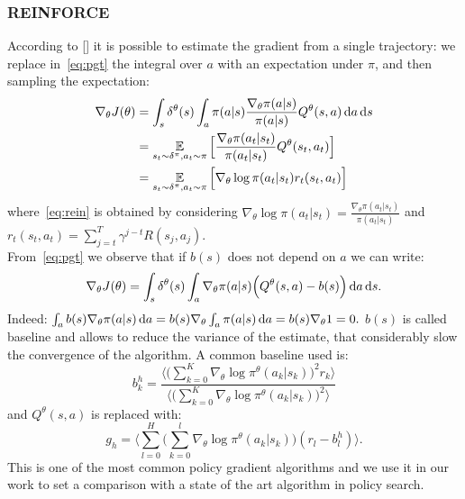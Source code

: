 \subsubsection{REINFORCE}
According to [\citet{Williams1992SimpleSG}] it is possible to estimate the gradient from a single trajectory: we replace in~\eqref{eq:pgt} the integral over $a$ with an expectation under $\pi$, and then sampling the expectation:
\begin{align}
	\nabla_{\theta}J(\theta) &= \int_s \delta^{\theta}(s) \int_a \pi(a|s) \frac{\nabla_{\theta} \pi(a|s)}{\pi(a|s)} Q^{\theta}(s,a) \,\mathrm{d} a \,\mathrm{d} s \nonumber\\
	&= \operatorname*{\mathbb{E}}_{s_t \sim \delta^{\pi}, a_t \sim \pi} \Big[ \frac{\nabla_{\theta} \pi(a_t|s_t)}{\pi(a_t|s_t)} Q^{\theta}(s_t,a_t) \Big] \nonumber\\
	&= \operatorname*{\mathbb{E}}_{s_t \sim \delta^{\pi}, a_t \sim \pi} \Big[ \nabla_{\theta} \log\pi(a_t|s_t) r_t(s_t, a_t) \Big] \label{eq:rein}
\end{align}
where~\eqref{eq:rein} is obtained by considering $\nabla_{\theta} \log\pi(a_t|s_t) = \frac{\nabla_{\theta} \pi(a_t|s_t)}{\pi(a_t|s_t)}$ and $r_t(s_t, a_t) = \sum_{j = t}^T \gamma^{j-t} R(s_j, a_j)$.\\
\newline
From~\eqref{eq:pgt} we observe that if $b(s)$ does not depend on $a$ we can write:
$$ \nabla_{\theta}J(\theta) = \int_s \delta^{\theta}(s) \int_a \nabla_{\theta} \pi(a|s) \Big( Q^{\theta}(s,a) -b(s) \Big) \,\mathrm{d} a \,\mathrm{d} s. $$
Indeed: $\int_a b(s) \nabla_{\theta} \pi(a|s) \,\mathrm{d} a = b(s) \nabla_{\theta} \int_a \pi(a|s) \,\mathrm{d} a = b(s) \nabla_{\theta} 1 = 0.$
$b(s)$ is called baseline and allows to reduce the variance of the estimate, that considerably slow the convergence of the algorithm.
A common baseline used is:
$$ b_k^h = \frac{\Big\langle\Big( \sum_{k=0}^{K}\nabla_{\theta} \log\pi^{\theta}(a_k|s_k)\Big)^2r_k \Big\rangle}{\Big\langle\Big( \sum_{k=0}^{K}\nabla_{\theta} \log\pi^{\theta}(a_k|s_k)\Big)^2\Big \rangle}
$$
and $Q^{\theta}(s,a)$ is replaced with:
$$ g_h = \Big\langle \sum_{l=0}^{H} \Big( \sum_{k=0}^{l} \nabla_{\theta} \log \pi^{\theta}(a_k|s_k)\Big)(r_l - b_l^h)\Big\rangle.
$$
This is one of the most common policy gradient algorithms and we use it in our work to set a comparison with a state of the art algorithm in policy search.


